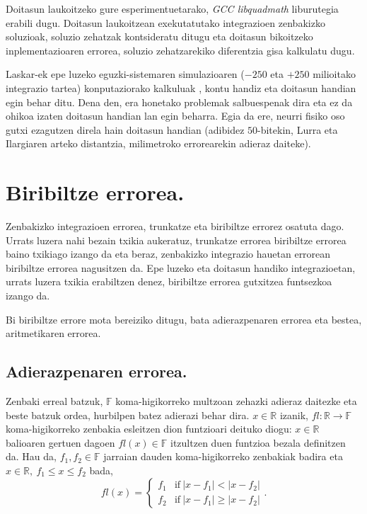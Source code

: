 Doitasun laukoitzeko gure esperimentuetarako, \emph{GCC libquadmath} liburutegia \cite{libquad} erabili dugu. Doitasun laukoitzean exekutatutako integrazioen zenbakizko soluzioak, soluzio zehatzak kontsideratu ditugu eta  doitasun bikoitzeko inplementazioaren errorea, soluzio zehatzarekiko diferentzia gisa kalkulatu dugu. 

Laskar-ek epe luzeko eguzki-sistemaren simulazioaren ($-250$ eta $+250$ milioitako integrazio tartea) konputaziorako kalkuluak \cite{Laskar2011}, kontu handiz eta doitasun handian egin behar ditu. Dena den, era honetako problemak salbuespenak dira eta ez da ohikoa izaten doitasun handian lan egin beharra. Egia da ere, neurri fisiko oso gutxi ezagutzen direla  hain doitasun handian (adibidez $50$-bitekin, Lurra eta Ilargiaren arteko distantzia, milimetroko errorearekin adieraz daiteke).  


\section{Biribiltze errorea.}

Zenbakizko integrazioen errorea, trunkatze eta biribiltze errorez osatuta dago. Urrats luzera nahi bezain txikia aukeratuz, trunkatze errorea biribiltze errorea baino txikiago izango da eta beraz, zenbakizko integrazio hauetan errorean biribiltze errorea nagusitzen da. Epe luzeko eta doitasun handiko integrazioetan, urrats luzera txikia erabiltzen denez, biribiltze errorea gutxitzea funtsezkoa izango da.     

Bi biribiltze errore mota bereiziko ditugu, bata adierazpenaren errorea eta bestea, aritmetikaren errorea.  

\subsection*{Adierazpenaren errorea.} 

Zenbaki erreal batzuk, $\mathbb{F}$ koma-higikorreko multzoan zehazki adieraz daitezke eta beste batzuk ordea, hurbilpen batez adierazi behar dira. $x \in \mathbb{R}$ izanik, $fl: \mathbb{R} \rightarrow \mathbb{F}$ koma-higikorreko zenbakia esleitzen dion funtzioari deituko diogu:  $x \in \mathbb{R}$ balioaren gertuen dagoen  $fl(x) \in \mathbb{F}$ itzultzen duen funtzioa bezala definitzen da. Hau da, $f_1,f_2 \in \mathbb{F}$ jarraian dauden koma-higikorreko zenbakiak  badira eta $x \in \mathbb{R}, \ f_1\leqslant x \leqslant f_2$ bada,
\begin{equation*}
fl(x)=
\left\{
        \begin{array}{lc}
        f_1 & \mathrm{if} \ |x-f_1| < |x-f_2| \\
        f_2 & \mathrm{if} \ |x-f_1| \geqslant |x-f_2| 
        \end{array}.
\right.
\end{equation*}  

